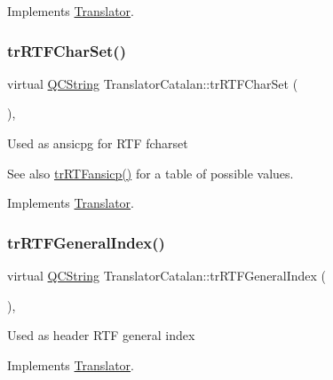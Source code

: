 Implements \mbox{\hyperlink{class_translator_a9953a4c0e6a4fc7d017abcd5c2939e0f}{Translator}}.

\mbox{\label{class_translator_catalan_ae6c4c05d4950d8cd4913d79cd0bc1a4e}} 
\subsubsection{\texorpdfstring{trRTFCharSet()}{trRTFCharSet()}}
{\footnotesize\ttfamily virtual \mbox{\hyperlink{class_q_c_string}{Q\+C\+String}} Translator\+Catalan\+::tr\+R\+T\+F\+Char\+Set (\begin{DoxyParamCaption}{ }\end{DoxyParamCaption})\hspace{0.3cm}{\ttfamily [inline]}, {\ttfamily [virtual]}}

Used as ansicpg for R\+TF fcharset \begin{DoxySeeAlso}{See also}
\mbox{\hyperlink{class_translator_catalan_aabb72d68b8b4454cc1595a10c4914f83}{tr\+R\+T\+Fansicp()}} for a table of possible values. 
\end{DoxySeeAlso}


Implements \mbox{\hyperlink{class_translator_afad391f3cbfb5ce6332b7239f8e2049a}{Translator}}.

\mbox{\label{class_translator_catalan_a134f16820f3bb2c7d85f99f5baf4ca51}} 
\subsubsection{\texorpdfstring{trRTFGeneralIndex()}{trRTFGeneralIndex()}}
{\footnotesize\ttfamily virtual \mbox{\hyperlink{class_q_c_string}{Q\+C\+String}} Translator\+Catalan\+::tr\+R\+T\+F\+General\+Index (\begin{DoxyParamCaption}{ }\end{DoxyParamCaption})\hspace{0.3cm}{\ttfamily [inline]}, {\ttfamily [virtual]}}

Used as header R\+TF general index 

Implements \mbox{\hyperlink{class_translator}{Translator}}.

